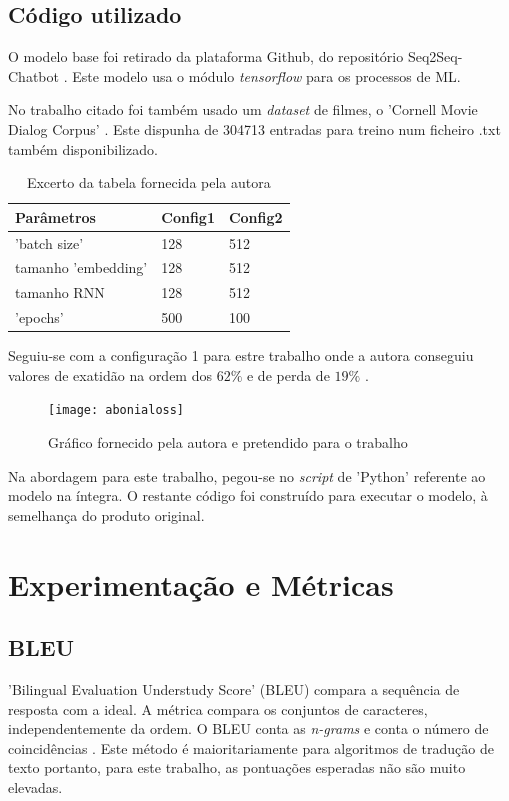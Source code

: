 \documentclass{article}
\begin{document}
\subsection{Código utilizado}
O modelo base foi retirado da plataforma Github, do repositório Seq2Seq-Chatbot \cite{abonia2020seq2seq}. Este modelo usa o módulo \textit{tensorflow} para os processos de ML.

No trabalho citado foi também usado um \textit{dataset} de filmes, o 'Cornell Movie Dialog Corpus' \cite{cornell}. Este dispunha de 304713 entradas para treino num ficheiro .txt também disponibilizado.

\begin{table}[htb]
    \centering
    \begin{tabular}{l | l l}
        \hline
        Parâmetros  & Config1 & Config2 \\
        \hline
        'batch size' &  128  &  512 \\
        tamanho 'embedding' &  128     &  512  \\
        tamanho RNN  & 128     &  512 \\
        'epochs' &  500  &  100 \\
    \end{tabular}
    \caption{Excerto da tabela fornecida pela autora}
    \cite{sojasingarayar2020seq2seq}
    \label{tabmodel}
\end{table}

Seguiu-se com a configuração 1 para estre trabalho onde a autora conseguiu valores de exatidão na ordem dos $62\%$ e de perda de $19\%$ \cite{sojasingarayar2020seq2seq}.

\begin{figure}[htb]
    \centering
    \texttt{[image: abonialoss]}
    \caption{Gráfico fornecido pela autora e pretendido para o trabalho}
    \label{abonialoss}
\end{figure}

Na abordagem para este trabalho, pegou-se no \textit{script} de 'Python' referente ao modelo na íntegra. O restante código foi construído para executar o modelo, à semelhança do produto original.

\section{Experimentação e Métricas}
\label{metricas}
\subsection{BLEU}
'Bilingual Evaluation Understudy Score' (BLEU) compara a sequência de resposta com a ideal. A métrica compara os conjuntos de caracteres, independentemente da ordem. O BLEU conta as \textit{n-grams} e conta o número de coincidências \cite{papineni2002bleu}. Este método é maioritariamente para algoritmos de tradução de texto portanto, para este trabalho, as pontuações esperadas não são muito elevadas. 
\end{document}
